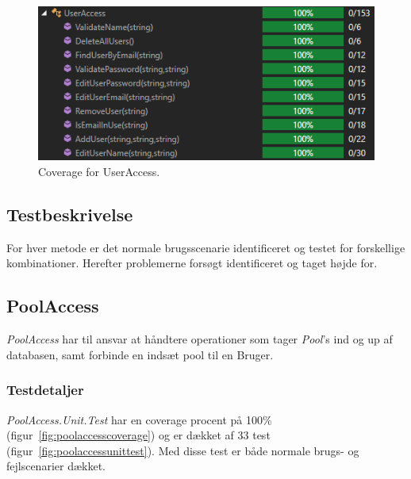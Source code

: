 \begin{figure}[h]
\centering
\includegraphics[width=0.7\linewidth]{figs/test/useraccesscoverage}
\caption{Coverage for UserAccess.}
\label{fig:useraccesscoverage}
\end{figure}

\subsection{Testbeskrivelse}
For hver metode er det normale brugsscenarie identificeret og testet for forskellige kombinationer. Herefter problemerne forsøgt identificeret og taget højde for.
 

\subsection{PoolAccess}
\textit{PoolAccess} har til ansvar at håndtere operationer som tager \textit{Pool}'s ind og up af databasen, samt forbinde en indsæt pool til en Bruger. 

\subsubsection{Testdetaljer}
\textit{PoolAccess.Unit.Test} har en coverage procent på 100\% (figur~\ref{fig:poolaccesscoverage}) og er dækket af 33 test (figur~\ref{fig:poolaccessunittest}). Med disse test er både normale brugs- og fejlscenarier dækket.

